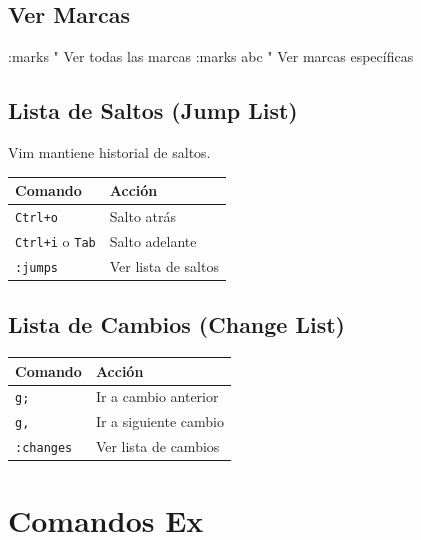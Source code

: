\documentclass[
  doc,
  floatsintext,
  longtable,
  a4paper,
  nolmodern,
  notxfonts,
  notimes,
  12pt,
  colorlinks=true,linkcolor=blue,citecolor=blue,urlcolor=blue]{apa7}
\newenvironment{Shaded}{\begin{snugshade}}{\end{snugshade}}
\newcommand{\NormalTok}[1]{\textcolor[rgb]{0.00,0.23,0.31}{#1}}
\newcounter{none} %
\begin{document}
\subsection{Ver Marcas}\label{ver-marcas}

\begin{Shaded}
\begin{Highlighting}[]
\NormalTok{:marks          " Ver todas las marcas}
\NormalTok{:marks abc      " Ver marcas específicas}
\end{Highlighting}
\end{Shaded}

\subsection{Lista de Saltos (Jump
List)}\label{lista-de-saltos-jump-list}

Vim mantiene historial de saltos.

{\def\LTcaptype{none} %
\begin{longtable}[]{@{}ll@{}}
\toprule\noalign{}
Comando & Acción \\
\midrule\noalign{}
\endhead
\bottomrule\noalign{}
\endlastfoot
\texttt{Ctrl+o} & Salto atrás \\
\texttt{Ctrl+i} o \texttt{Tab} & Salto adelante \\
\texttt{:jumps} & Ver lista de saltos \\
\end{longtable}
}

\subsection{Lista de Cambios (Change
List)}\label{lista-de-cambios-change-list}

{\def\LTcaptype{none} %
\begin{longtable}[]{@{}ll@{}}
\toprule\noalign{}
Comando & Acción \\
\midrule\noalign{}
\endhead
\bottomrule\noalign{}
\endlastfoot
\texttt{g;} & Ir a cambio anterior \\
\texttt{g,} & Ir a siguiente cambio \\
\texttt{:changes} & Ver lista de cambios \\
\end{longtable}
}

\section{Comandos Ex}\label{comandos-ex}
\end{document}

